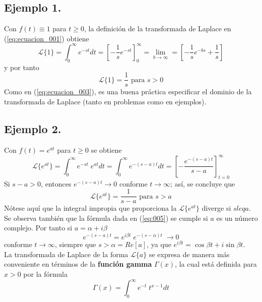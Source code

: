 \subsection*{Ejemplo 1.}
Con $f(t) \equiv 1$ para $t \geq 0$, la definición de la transformada de Laplace en (\ref{eq:ecuacion_001}) obtiene
\[ \mathscr{L} \{ 1 \} = \int_{0}^{\infty} e^{-st} dt = \left[ - \dfrac{1}{s} e^{-st} \right]_{0}^{\infty} = \lim_{b \to \infty} = \left[ - \dfrac{1}{s} e^{-bs} + \dfrac{1}{s} \right] \]
y por tanto
\begin{equation}
\mathscr{L} \{ 1 \} = \dfrac{1}{s} \mbox{ para } s > 0
\label{eq:ecuacion_003}
\end{equation}
Como en (\ref{eq:ecuacion_003}), es una buena práctica especificar el dominio de la transformada de Laplace (tanto en problemas como en ejemplos).
\subsection*{Ejemplo 2.}
Con $f(t) = e^{at}$ para $t \geq 0$ se obtiene
\[ \mathscr{L} \{ e^{at} \} = \int_{0}^{\infty} e^{-st} \; e^{at} dt = \int_{0}^{\infty} e^{-(s - a)t} dt =  \left[ - \dfrac{e^{-(s - a)t}}{s - a} \right]_{t=0}^{\infty}  \]
Si $s -a > 0$, entonces $e^{-(s - a) t} \to 0$ conforme $t \to \infty$; así, se concluye que
\begin{equation}
\mathscr{L} \{ e^{at} \} = \dfrac{1}{s - a} \mbox{ para } s > a
\label{eq:005}
\end{equation}
Nótese aquí que la integral impropia que proporciona la $\mathscr{L} \{ e^{at} \}$ diverge si $s leq a$. Se observa también que la fórmula dada en (\ref{eq:005}) se cumple si $a$ es un número complejo. Por tanto si $a = \alpha + i \beta$
\[ e^{-(s - a)t} = e^{i \beta t} \; e^{-(s - \alpha) t} \; \to 0 \]
conforme $t \to \infty$, siempre que $s > \alpha = Re[a]$, ya que $e^{i \beta t} = \cos \beta t + i \sin \beta t$.
\\
La transformada de Laplace de la forma $\mathscr{L} \{ a \}$ se expresa de manera más conveniente en términos de la \textbf{función gamma} $\Gamma(x)$, la cual está definida para $x > 0$ por la fórmula
\begin{equation}
\Gamma (x) = \int_{0}^{\infty} e^{-t} \; t^{x-1} dt
\label{eq:006}
\end{equation}
